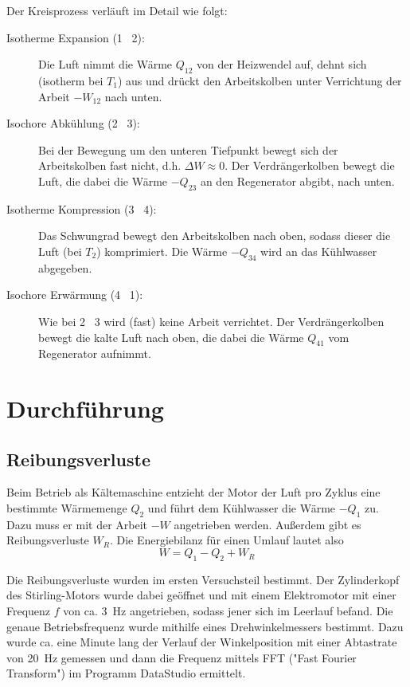 Der Kreisprozess verläuft im Detail wie folgt:
\begin{description}
	\item[Isotherme Expansion (1 \textrightarrow\ 2):] Die Luft nimmt die Wärme $Q_{12}$ von der Heizwendel auf, dehnt sich (isotherm bei $T_1$) aus und drückt den Arbeitskolben unter Verrichtung der Arbeit $-W_{12}$ nach unten.
	\item[Isochore Abkühlung (2 \textrightarrow\ 3):] Bei der Bewegung um den unteren Tiefpunkt bewegt sich der Arbeitskolben fast nicht, d.h. $\Delta W \approx 0$. Der Verdrängerkolben bewegt die Luft, die dabei die Wärme $-Q_{23}$ an den Regenerator abgibt, nach unten.
	\item[Isotherme Kompression (3 \textrightarrow\ 4):] Das Schwungrad bewegt den Arbeitskolben nach oben, sodass dieser die Luft (bei $T_2$) komprimiert. Die Wärme $-Q_{34}$ wird an das Kühlwasser abgegeben.
	\item[Isochore Erwärmung (4 \textrightarrow\ 1):] Wie bei 2 \textrightarrow\ 3 wird (fast) keine Arbeit verrichtet. Der Verdrängerkolben bewegt die kalte Luft nach oben, die dabei die Wärme $Q_{41}$ vom Regenerator aufnimmt.
\end{description}

\section{Durchführung}
\subsection{Reibungsverluste}
Beim Betrieb als Kältemaschine entzieht der Motor der Luft pro Zyklus eine bestimmte Wärmemenge $Q_2$ und führt dem Kühlwasser die Wärme $-Q_1$ zu. Dazu muss er mit der Arbeit $-W$ angetrieben werden. Außerdem gibt es Reibungsverluste $W_R$. Die Energiebilanz für einen Umlauf lautet also
\begin{equation}\label{eq:energiebilanz}
	W = Q_1 - Q_2 + W_R
\end{equation}

Die Reibungsverluste wurden im ersten Versuchsteil bestimmt. Der Zylinderkopf des Stirling-Motors wurde dabei geöffnet und mit einem Elektromotor mit einer Frequenz $f$ von ca. \SI{3}{\Hz} angetrieben, sodass jener sich im Leerlauf befand. Die genaue Betriebsfrequenz wurde mithilfe eines Drehwinkelmessers bestimmt. Dazu wurde ca. eine Minute lang der Verlauf der Winkelposition mit einer Abtastrate von \SI{20}{\Hz} gemessen und dann die Frequenz mittels FFT ("Fast Fourier Transform") im Programm DataStudio ermittelt.

